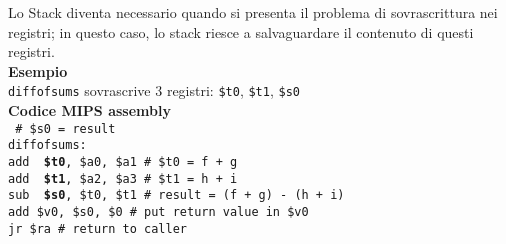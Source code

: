 \documentclass[../main.tex]{subfiles}
\begin{document}
\noindent
Lo Stack diventa necessario quando si presenta il problema di
sovrascrittura nei registri; in questo caso, lo stack riesce a
salvaguardare il contenuto di questi registri. \\[5mm]
\textbf{Esempio} \\
\texttt{diffofsums} sovrascrive 3 registri: \texttt{\$t0}, \texttt{\$t1}, \texttt{\$s0} \\[2mm]
\textbf{Codice MIPS assembly} \\
\texttt{
    \# \$s0 = result \\
    diffofsums: \\
    \hspace*{0cm} \hspace*{0cm} \hspace*{0cm} \hspace*{0cm} add {\color{red} \textbf{\$t0}}, \$a0, \$a1 \hspace*{0cm} \# \$t0 = f + g \\
    \hspace*{0cm} \hspace*{0cm} \hspace*{0cm} \hspace*{0cm} add {\color{red} \textbf{\$t1}}, \$a2, \$a3 \hspace*{0cm} \# \$t1 = h + i \\
    \hspace*{0cm} \hspace*{0cm} \hspace*{0cm} \hspace*{0cm} sub {\color{red} \textbf{\$s0}}, \$t0, \$t1 \hspace*{0cm} \# result = (f + g) - (h + i) \\
    \hspace*{0cm} \hspace*{0cm} \hspace*{0cm} \hspace*{0cm} add \$v0, \$s0, \$0 \hspace*{0cm} \hspace*{0cm} \# put return value in \$v0 \\
    \hspace*{0cm} \hspace*{0cm} \hspace*{0cm} \hspace*{0cm} jr \$ra \hspace*{0cm} \hspace*{0cm} \hspace*{0cm} \hspace*{0cm} \hspace*{0cm} \hspace*{0cm} \hspace*{0cm} \hspace*{0cm} \hspace*{0cm} \hspace*{0cm} \hspace*{0cm} \hspace*{0cm} \# return to caller \\
}
\end{document}
